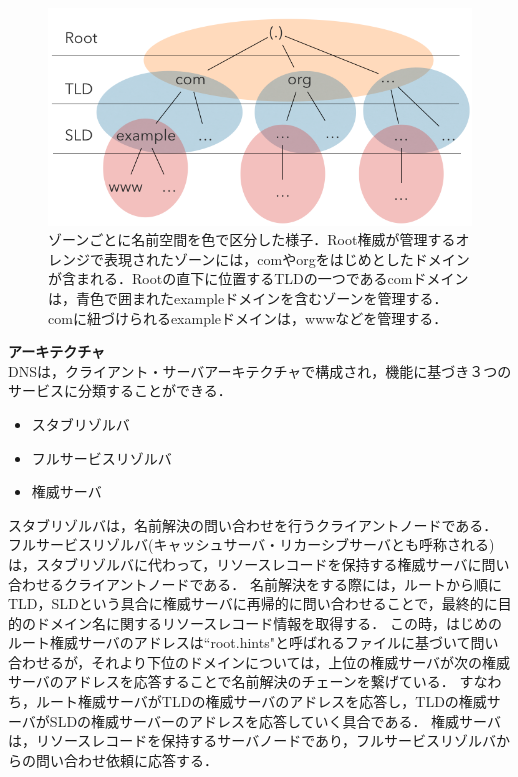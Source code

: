 \begin{figure}[h]
 \centering
 \includegraphics[width=12.0cm]{figure/dns-architecture.png}
 \caption[ゾーンごとに分割された名前空間]{ゾーンごとに名前空間を色で区分した様子．Root権威が管理するオレンジで表現されたゾーンには，comやorgをはじめとしたドメインが含まれる．Rootの直下に位置するTLDの一つであるcomドメインは，青色で囲まれたexampleドメインを含むゾーンを管理する．comに紐づけられるexampleドメインは，wwwなどを管理する．}
 \label{fig:dns-architecture}
\end{figure}

\textbf{アーキテクチャ}\\
DNSは，クライアント・サーバアーキテクチャで構成され，機能に基づき３つのサービスに分類することができる．
\begin{itemize}
 \item スタブリゾルバ
 \vspace{-3mm}
 \item フルサービスリゾルバ
 \vspace{-3mm}
 \item 権威サーバ
\end{itemize}

スタブリゾルバは，名前解決の問い合わせを行うクライアントノードである．
フルサービスリゾルバ(キャッシュサーバ・リカーシブサーバとも呼称される)は，スタブリゾルバに代わって，リソースレコードを保持する権威サーバに問い合わせるクライアントノードである．
名前解決をする際には，ルートから順にTLD，SLDという具合に権威サーバに再帰的に問い合わせることで，最終的に目的のドメイン名に関するリソースレコード情報を取得する．
この時，はじめのルート権威サーバのアドレスは``root.hints"と呼ばれるファイルに基づいて問い合わせるが，それより下位のドメインについては，上位の権威サーバが次の権威サーバのアドレスを応答することで名前解決のチェーンを繋げている．
すなわち，ルート権威サーバがTLDの権威サーバのアドレスを応答し，TLDの権威サーバがSLDの権威サーバーのアドレスを応答していく具合である．
権威サーバは，リソースレコードを保持するサーバノードであり，フルサービスリゾルバからの問い合わせ依頼に応答する．

